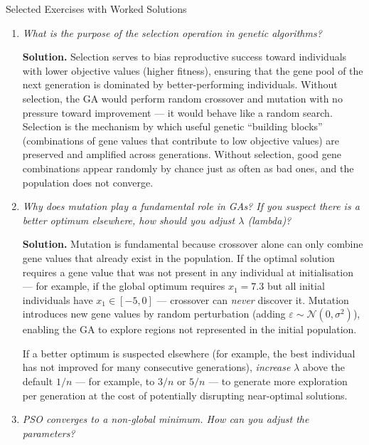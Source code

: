 \documentclass[aspectratio=169,10pt]{beamer}
\begin{document}
\begin{frame}[allowframebreaks]{Selected Exercises with Worked Solutions}

  \begin{enumerate}
    \item[\textbf{9.1}] \textit{What is the purpose of the selection
      operation in genetic algorithms?}

      \textbf{Solution.}  Selection serves to bias reproductive
      success toward individuals with lower objective values (higher
      fitness), ensuring that the gene pool of the next generation
      is dominated by better-performing individuals.  Without
      selection, the GA would perform random crossover and mutation
      with no pressure toward improvement --- it would behave like
      a random search.  Selection is the mechanism by which useful
      genetic ``building blocks'' (combinations of gene values that
      contribute to low objective values) are preserved and amplified
      across generations.  Without selection, good gene combinations
      appear randomly by chance just as often as bad ones, and the
      population does not converge.

    \item[\textbf{9.2}] \textit{Why does mutation play a fundamental
      role in GAs? If you suspect there is a better optimum
      elsewhere, how should you adjust $\lambda$ (lambda)?}

      \textbf{Solution.}  Mutation is fundamental because crossover
      alone can only combine gene values that already exist in the
      population.  If the optimal solution requires a gene value
      that was not present in any individual at initialisation ---
      for example, if the global optimum requires $x_1 = 7.3$ but
      all initial individuals have $x_1 \in [-5, 0]$ --- crossover
      can \emph{never} discover it.  Mutation introduces new gene
      values by random perturbation (adding $\varepsilon \sim
      \mathcal{N}(0, \sigma^2)$), enabling the GA to explore regions
      not represented in the initial population.

      If a better optimum is suspected elsewhere (for example, the
      best individual has not improved for many consecutive
      generations), \emph{increase} $\lambda$ above the default
      $1/n$ --- for example, to $3/n$ or $5/n$ --- to generate
      more exploration per generation at the cost of potentially
      disrupting near-optimal solutions.

    \item[\textbf{9.3}] \textit{PSO converges to a non-global
      minimum. How can you adjust the parameters?}


\end{enumerate}
\end{frame}
\end{document}
